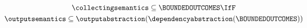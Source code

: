 \begin{gather*}
  \collectingsemantics \subseteq \BOUNDEDOUTCOMES
  \IfF \\
  \outputsemantics \subseteq \outputabstraction(\dependencyabstraction(\BOUNDEDOUTCOMES))
\end{gather*}
